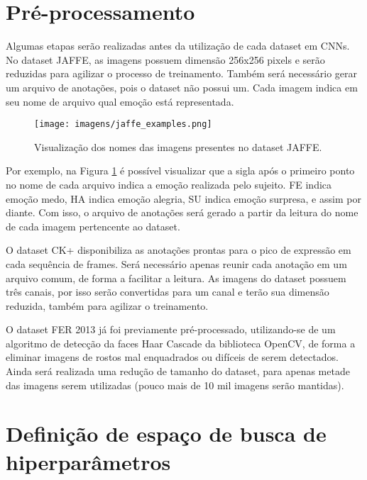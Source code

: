 \documentclass[
12pt,				%
openright,			%
oneside,			%
a4paper,			%
english,			%
french,				%
spanish,			%
brazil				%
]{abntex2}
\begin{document}
\section{Pré-processamento}

Algumas etapas serão realizadas antes da utilização de cada dataset em CNNs. No dataset JAFFE, as imagens possuem dimensão 256x256 pixels e serão reduzidas para agilizar o processo de treinamento. Também será necessário gerar um arquivo de anotações, pois o dataset não possui um. Cada imagem indica em seu nome de arquivo qual emoção está representada.

\begin{figure}[ht]
\centering
\caption{Visualização dos nomes das imagens presentes no dataset JAFFE.}
\texttt{[image: imagens/jaffe\_examples.png]}
\label{fig:jaffe_label}
\end{figure}

Por exemplo, na Figura \ref{fig:jaffe_label} é possível visualizar que a sigla após o primeiro ponto no nome de cada arquivo indica a emoção realizada pelo sujeito. FE indica emoção medo, HA indica emoção alegria, SU indica emoção surpresa, e assim por diante. Com isso, o arquivo de anotações será gerado a partir da leitura do nome de cada imagem pertencente ao dataset.

O dataset CK+ disponibiliza as anotações prontas para o pico de expressão em cada sequência de frames. Será necessário apenas reunir cada anotação em um arquivo comum, de forma a facilitar a leitura. As imagens do dataset possuem três canais, por isso serão convertidas para um canal e terão sua dimensão reduzida, também para agilizar o treinamento.

O dataset FER 2013 já foi previamente pré-processado, utilizando-se de um algoritmo de detecção da faces Haar Cascade da biblioteca OpenCV, de forma a eliminar imagens de rostos mal enquadrados ou difíceis de serem detectados. Ainda será realizada uma redução de tamanho do dataset, para apenas metade das imagens serem utilizadas (pouco mais de 10 mil imagens serão mantidas).


\section{Definição de espaço de busca de hiperparâmetros}
\end{document}
